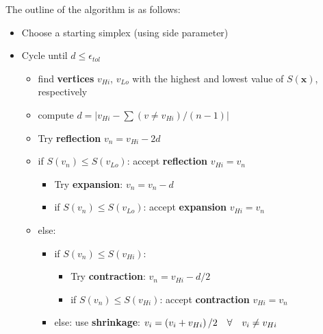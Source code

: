 The outline of the algorithm is as follows:
\begin{bbox}

    \begin{itemize}
        \item Choose a starting simplex (using side parameter)
        \item Cycle until $ d \le \epsilon_{tol} $
        \begin{itemize}
            \item find \textbf{vertices} $ v_{Hi} $, $ v_{Lo} $ with the highest and lowest
                value of $ S(\mathbf{x}) $, respectively
            \item compute $ d = \left| v_{Hi} - \sum \left( v \ne v_{Hi} \right) / (n - 1) \right| $
            \item Try \textbf{reflection} $ v_n = v_{Hi} - 2d $
            \item if $ S(v_n) \le S(v_{Lo}) $: accept \textbf{reflection} $ v_{Hi} = v_n $

            \begin{itemize}
                \item Try \textbf{expansion}: $ v_n = v_n - d $

                \item if $ S(v_n) \le S(v_{Lo}) $: accept \textbf{expansion} $ v_{Hi} = v_n $

            \end{itemize}
            \item else:
            \begin{itemize}
                \item if $ S(v_n) \le S(v_{Hi}) $:
                \begin{itemize}
                    \item Try \textbf{contraction}: $ v_n = v_{Hi} - d / 2 $

                    \item if $ S(v_n) \le S(v_{Hi}) $: accept \textbf{contraction} $ v_{Hi} = v_n $

                \end{itemize}
                \item else: use \textbf{shrinkage}:
                    $ v_{i} = \left( v_{i} + v_{Hi} \right) / 2 \quad \forall \quad v_i \ne v_{Hi} $

            \end{itemize}
        \end{itemize}
    \end{itemize}

\end{bbox}

